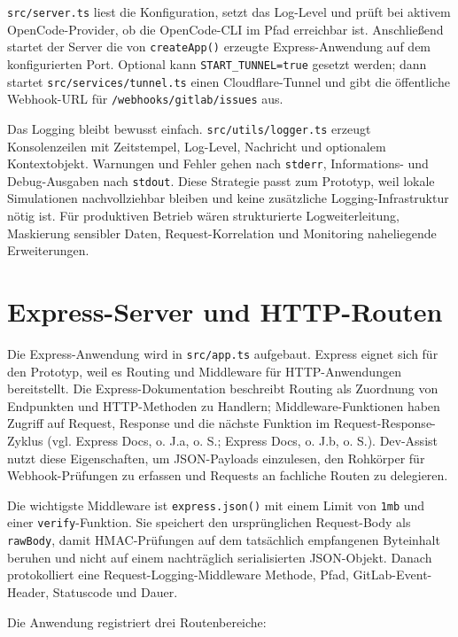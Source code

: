 \documentclass[12pt,a4paper,oneside]{scrreprt}
\begin{document}
\texttt{src/server.ts} liest die Konfiguration, setzt das Log-Level und prüft bei aktivem OpenCode-Provider, ob die OpenCode-CLI im Pfad erreichbar ist. Anschließend startet der Server die von \texttt{createApp()} erzeugte Express-Anwendung auf dem konfigurierten Port. Optional kann \texttt{START\_TUNNEL=true} gesetzt werden; dann startet \texttt{src/services/tunnel.ts} einen Cloudflare-Tunnel und gibt die öffentliche Webhook-URL für \texttt{/webhooks/gitlab/issues} aus.

Das Logging bleibt bewusst einfach. \texttt{src/utils/logger.ts} erzeugt Konsolenzeilen mit Zeitstempel, Log-Level, Nachricht und optionalem Kontextobjekt. Warnungen und Fehler gehen nach \texttt{stderr}, Informations- und Debug-Ausgaben nach \texttt{stdout}. Diese Strategie passt zum Prototyp, weil lokale Simulationen nachvollziehbar bleiben und keine zusätzliche Logging-Infrastruktur nötig ist. Für produktiven Betrieb wären strukturierte Logweiterleitung, Maskierung sensibler Daten, Request-Korrelation und Monitoring naheliegende Erweiterungen.

\section{Express-Server und HTTP-Routen}

Die Express-Anwendung wird in \texttt{src/app.ts} aufgebaut. Express eignet sich für den Prototyp, weil es Routing und Middleware für HTTP-Anwendungen bereitstellt. Die Express-Dokumentation beschreibt Routing als Zuordnung von Endpunkten und HTTP-Methoden zu Handlern; Middleware-Funktionen haben Zugriff auf Request, Response und die nächste Funktion im Request-Response-Zyklus (vgl. Express Docs, o. J.a, o. S.; Express Docs, o. J.b, o. S.). Dev-Assist nutzt diese Eigenschaften, um JSON-Payloads einzulesen, den Rohkörper für Webhook-Prüfungen zu erfassen und Requests an fachliche Routen zu delegieren.

Die wichtigste Middleware ist \texttt{express.json()} mit einem Limit von \texttt{1mb} und einer \texttt{verify}-Funktion. Sie speichert den ursprünglichen Request-Body als \texttt{rawBody}, damit HMAC-Prüfungen auf dem tatsächlich empfangenen Byteinhalt beruhen und nicht auf einem nachträglich serialisierten JSON-Objekt. Danach protokolliert eine Request-Logging-Middleware Methode, Pfad, GitLab-Event-Header, Statuscode und Dauer.

Die Anwendung registriert drei Routenbereiche:
\end{document}
